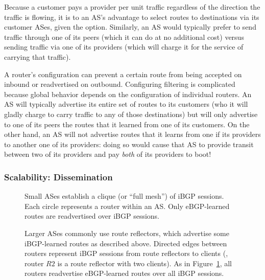 Because a customer pays a provider per unit traffic regardless of the
direction the traffic is flowing, it is to an AS's advantage to select
routes to destinations via its customer ASes, given the option.
Similarly, an AS would typically prefer to send traffic through one of
its peers (which it can do at no additional cost) versus sending traffic
via one of its providers (which will charge it for the service of
carrying that traffic).


A router's configuration can prevent a certain route from being accepted
on inbound or readvertised on outbound.  Configuring filtering is
complicated because global behavior depends on the configuration of
individual routers. An AS will
typically advertise its entire set of routes to its customers (who it
will gladly charge to carry traffic to any of those destinations) but
will only advertise to one of its peers the routes that it learned from
one of its customers.  On the other hand, an AS will not advertise
routes that it learns from one if its providers to another one of its
providers: doing so would cause that AS to provide transit between two
of its providers and pay {\em both} of its providers to boot!


\subsubsection{Scalability: Dissemination}\label{sec:dissemination}


\begin{figure}
\centering{}
\caption[Internal BGP configuration for small ASes: ``full mesh''
topology]{Small ASes establish 
a clique (or ``full mesh'') of iBGP 
sessions.  Each circle represents a router within an AS.  Only
eBGP-learned routes are readvertised over iBGP sessions.}
\label{fig:fullmesh}
\end{figure}

\begin{figure}
\centering
{}\hfill
{}
\caption[Internal BGP configuration for large ASes: route reflector
topology]{Larger ASes commonly use route reflectors, which advertise
some iBGP-learned routes as described above. Directed edges between routers
represent iBGP sessions from route reflectors to clients (\eg, router
$R2$ is a route reflector with two clients). As in
Figure~\ref{fig:fullmesh}, all routers readvertise eBGP-learned routes
over all iBGP sessions.}
\label{fig:ibgp_rr}
\end{figure}

